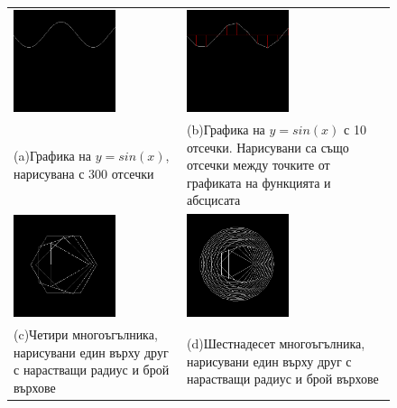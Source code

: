 \documentclass[12pt,a4paper]{article}
\begin{document}
{\begin{figure}
  \begin{center}
  \begin{tabular}{|p{5.2cm}p{5.2cm}|}
   \hline
   \vspace{10pt}
   \includegraphics[width=3cm]{images/graph_sine} &
   \vspace{10pt}
   \includegraphics[width=3cm]{images/graph_sine_coarse}\\
   (a)Графика на $y=sin(x)$, нарисувана с 300 отсечки&
   (b)Графика на $y=sin(x)$ с 10 отсечки. Нарисувани са също отсечки между точките от графиката на функцията и абсцисата\\%
   \vspace{10pt}
   \includegraphics[width=3cm]{images/graph_4_polygons}  &
   \vspace{10pt}
   \includegraphics[width=3cm]{images/graph_16_polygons}  \\
   (c)Четири многоъгълника, нарисувани един върху друг с нарастващи радиус и брой върхове
   \vspace{10pt}&
   (d)Шестнадесет многоъгълника, нарисувани един върху друг с нарастващи радиус и брой върхове
   \vspace{10pt}  \\%

\end{tabular}
\end{center}
\end{figure}}
\end{document}

